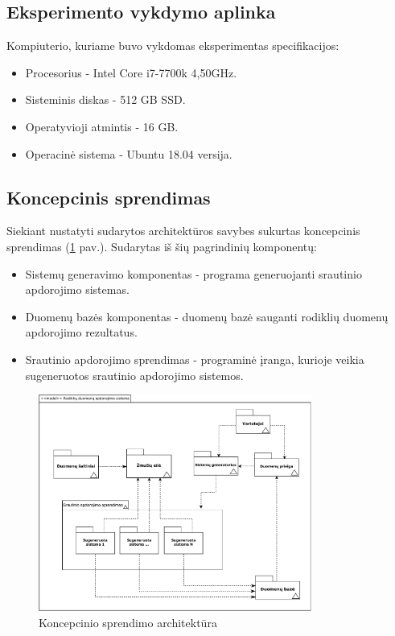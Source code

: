 \documentclass{VUMIFPSbakalaurinis}
\begin{document}
\subsection{Eksperimento vykdymo aplinka}

Kompiuterio, kuriame buvo vykdomas eksperimentas specifikacijos:
\begin{itemize}
    \item Procesorius - Intel Core i7-7700k 4,50GHz.
    \item Sisteminis diskas -  512 GB SSD.
    \item Operatyvioji atmintis - 16 GB.
    \item Operacinė sistema - Ubuntu 18.04 versija.
\end{itemize}

\subsection{Koncepcinis sprendimas}

Siekiant nustatyti sudarytos architektūros savybes sukurtas koncepcinis sprendimas (\ref{img:concept} pav.). Sudarytas iš šių pagrindinių komponentų:
\begin{itemize}
    \item Sistemų generavimo komponentas - programa generuojanti srautinio apdorojimo sistemas.
    \item Duomenų bazės komponentas - duomenų bazė sauganti rodiklių duomenų apdorojimo rezultatus.
    \item Srautinio apdorojimo sprendimas - programinė įranga, kurioje veikia sugeneruotos srautinio apdorojimo sistemos.
\end{itemize}

\begin{figure}[H]
    \centering
    \includegraphics[width=0.8\textwidth]{img/architekturos_diagrama.pdf}
    \caption{Koncepcinio sprendimo architektūra}
    \label{img:concept}
\end{figure}
\end{document}
